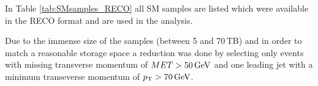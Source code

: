 In Table \ref{tab:SMsamples_RECO} all SM samples are listed which were available in the RECO format and are used in the analysis.
\renewcommand{\arraystretch}{1.5}
\begin{table}[!t]
\centering
\caption{Available and used Standard Model background samples with $\Delta E/\Delta x$ information.}
\label{tab:SMsamples_RECO}
\end{table}  
 
Due to the immense size of the samples (between 5 and 70\,TB) and in order to match a reasonable storage space a reduction was done by selecting only events with  missing transverse momentum of $MET>50\,\text{Ge}\kern-0.06667em\text{V}$ 
and one leading jet with a minimum transeverse momentum of $p_{\text{T}}>70\,\text{Ge}\kern-0.06667em\text{V}$.

